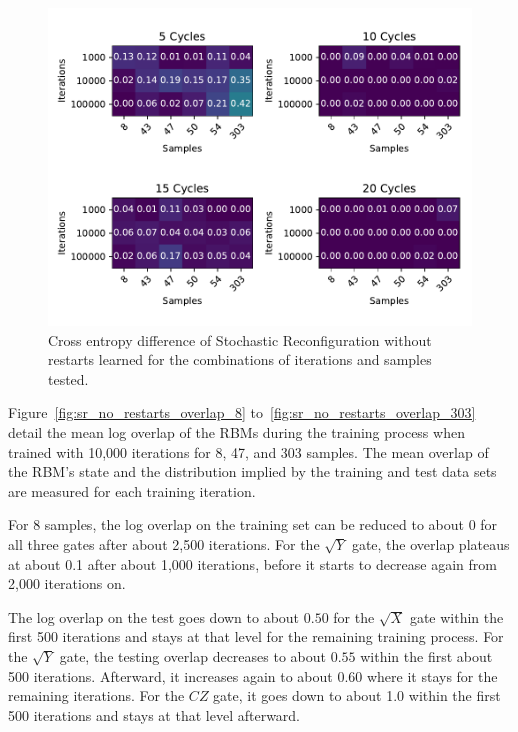 \begin{figure}[H]
  \centering
  \includegraphics[width=\textwidth]{figures/results/SR-no-restarts-learned/fxeb_heatmap.pdf}
  \caption[Cross entropy difference of Stochastic Reconfiguration without restarts learned]{Cross entropy difference of Stochastic 
  Reconfiguration without restarts learned for the combinations of iterations and samples tested.}
  \label{fig:sr_no_restarts_fxeb}
\end{figure}

Figure~\ref{fig:sr_no_restarts_overlap_8} to~\ref{fig:sr_no_restarts_overlap_303} detail the mean log overlap of the RBMs during the 
training process when trained with 10,000 iterations for 8, 47, and 303 samples. The 
mean overlap of the RBM's state and the distribution implied by the training and test data sets are measured 
for each training iteration.

For 8 samples, the log overlap on the training set can be reduced to about 0 for all three gates after about 2,500 iterations.
For the $\sqrt{Y}$ gate, the overlap plateaus at about 0.1 after about 1,000 iterations, before it starts 
to decrease again from 2,000 iterations on. 

The log overlap on the test goes down to about $0.50$ for the $\sqrt{X}$ gate within the first 500 iterations and stays at 
that level for the remaining training process. For the $\sqrt{Y}$ gate, the testing overlap decreases to about 
$0.55$ within the first about 500 iterations. Afterward, it increases again to about 0.60 where it stays for the 
remaining iterations. For the $CZ$ gate, it goes down to about 1.0 within the first 500 iterations and stays at 
that level afterward.


